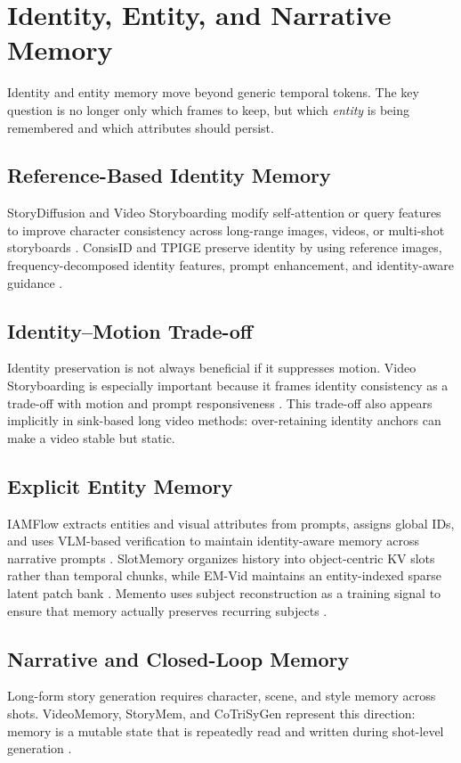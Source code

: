 \section{Identity, Entity, and Narrative Memory}

Identity and entity memory move beyond generic temporal tokens. The key question is no longer only which frames to keep, but which \emph{entity} is being remembered and which attributes should persist.

\subsection{Reference-Based Identity Memory}
StoryDiffusion and Video Storyboarding modify self-attention or query features to improve character consistency across long-range images, videos, or multi-shot storyboards \citep{storydiffusion2024,videostoryboarding2024}. ConsisID and TPIGE preserve identity by using reference images, frequency-decomposed identity features, prompt enhancement, and identity-aware guidance \citep{consisid2024,tpige2025}.

\subsection{Identity--Motion Trade-off}
Identity preservation is not always beneficial if it suppresses motion. Video Storyboarding is especially important because it frames identity consistency as a trade-off with motion and prompt responsiveness \citep{videostoryboarding2024}. This trade-off also appears implicitly in sink-based long video methods: over-retaining identity anchors can make a video stable but static.

\subsection{Explicit Entity Memory}
IAMFlow extracts entities and visual attributes from prompts, assigns global IDs, and uses VLM-based verification to maintain identity-aware memory across narrative prompts \citep{iamflow2026}. SlotMemory organizes history into object-centric KV slots rather than temporal chunks, while EM-Vid maintains an entity-indexed sparse latent patch bank \citep{slotmemory2026,emvid2026}. Memento uses subject reconstruction as a training signal to ensure that memory actually preserves recurring subjects \citep{memento2026}.

\subsection{Narrative and Closed-Loop Memory}
Long-form story generation requires character, scene, and style memory across shots. VideoMemory, StoryMem, and CoTriSyGen represent this direction: memory is a mutable state that is repeatedly read and written during shot-level generation \citep{videomemory2026,storymem2025,cotrisygen2026}.

